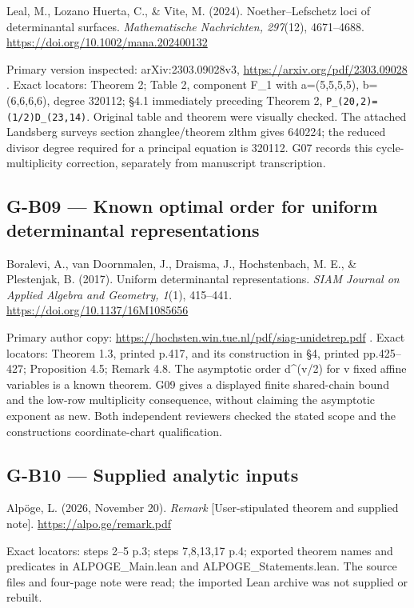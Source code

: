 \documentclass[11pt,a4paper]{article}
\theoremstyle{definition}\newtheorem{definition}{Definition}
\begin{document}
Leal, M., Lozano Huerta, C., \& Vite, M. (2024). Noether--Lefschetz loci
of determinantal surfaces. \emph{Mathematische Nachrichten, 297}(12),
4671--4688. \url{https://doi.org/10.1002/mana.202400132}

Primary version inspected: arXiv:2303.09028v3,
\url{https://arxiv.org/pdf/2303.09028} . Exact locators: Theorem 2;
Table 2, component F\_1 with a=(5,5,5,5), b=(6,6,6,6), degree 320112;
§4.1 immediately preceding Theorem 2,
\nolinkurl{P_(20,2)=(1/2)D_(23,14)}. Original table and theorem were
visually checked. The attached Landsberg survey\textquotesingle s
section zhanglee/theorem zlthm gives 640224; the reduced divisor degree
required for a principal equation is 320112. G07 records this
cycle-multiplicity correction, separately from manuscript transcription.

\subsection{G-B09 --- Known optimal order for uniform determinantal
representations}\label{g-b09--known-optimal-order-for-uniform-determinantal-representations}

Boralevi, A., van Doornmalen, J., Draisma, J., Hochstenbach, M. E., \&
Plestenjak, B. (2017). Uniform determinantal representations. \emph{SIAM
Journal on Applied Algebra and Geometry, 1}(1), 415--441.
\url{https://doi.org/10.1137/16M1085656}

Primary author copy:
\url{https://hochsten.win.tue.nl/pdf/siag-unidetrep.pdf} . Exact
locators: Theorem 1.3, printed p.417, and its construction in §4,
printed pp.425--427; Proposition 4.5; Remark 4.8. The asymptotic order
d\^{}(v/2) for v fixed affine variables is a known theorem. G09 gives a
displayed finite shared-chain bound and the low-row multiplicity
consequence, without claiming the asymptotic exponent as new. Both
independent reviewers checked the stated scope and the
construction\textquotesingle s coordinate-chart qualification.

\subsection{G-B10 --- Supplied analytic
inputs}\label{g-b10--supplied-analytic-inputs}

Alpöge, L. (2026, November 20). \emph{Remark} {[}User-stipulated theorem
and supplied note{]}. \url{https://alpo.ge/remark.pdf}

Exact locators: steps 2--5 p.3; steps 7,8,13,17 p.4; exported theorem
names and predicates in ALPOGE\_Main.lean and ALPOGE\_Statements.lean.
The source files and four-page note were read; the imported Lean archive
was not supplied or rebuilt.
\end{document}
